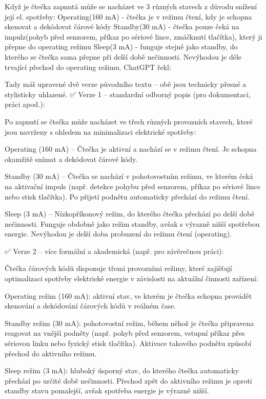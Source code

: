 Když je čtečka zapnutá může se nacházet ve 3 různých stavech z důvodu snížení její el. spotřeby:
Operating(160 mA) - čtečka je v režimu čtení, kdy je schopna skenovat a dekódovat čárové kódy
Standby(30 mA) - čtečka pouze čeká na impulz(pohyb před senzorem, příkaz po sériové lince, zmáčknutí tlačítka), který ji přepne do operating režimu
Sleep(3 mA) - funguje stejně jako standby, do kterého se čtečka sama přepne při delší době nečinnosti. Nevýhodou je déle trvající přechod do operating režimu.
ChatGPT řekl:

Tady máš upravené dvě verze původního textu – obě jsou technicky přesné a stylisticky uhlazené.
✅ Verze 1 – standardní odborný popis (pro dokumentaci, práci apod.):

    Po zapnutí se čtečka může nacházet ve třech různých provozních stavech, které jsou navrženy s ohledem na minimalizaci elektrické spotřeby:

        Operating (160 mA) – Čtečka je aktivní a nachází se v režimu čtení. Je schopna okamžitě snímat a dekódovat čárové kódy.

        Standby (30 mA) – Čtečka se nachází v pohotovostním režimu, ve kterém čeká na aktivační impuls (např. detekce pohybu před senzorem, příkaz po sériové lince nebo stisk tlačítka). Po přijetí podnětu automaticky přechází do režimu čtení.

        Sleep (3 mA) – Nízkopříkonový režim, do kterého čtečka přechází po delší době nečinnosti. Funguje obdobně jako režim standby, avšak s výrazně nižší spotřebou energie. Nevýhodou je delší doba probuzení do režimu čtení (operating).

✅ Verze 2 – více formální a akademická (např. pro závěrečnou práci):

    Čtečka čárových kódů disponuje třemi provozními režimy, které zajišťují optimalizaci spotřeby elektrické energie v závislosti na aktuální činnosti zařízení:

        Operating režim (160 mA): aktivní stav, ve kterém je čtečka schopna provádět skenování a dekódování čárových kódů v reálném čase.

        Standby režim (30 mA): pohotovostní režim, během něhož je čtečka připravena reagovat na vnější podněty (např. pohyb před senzorem, vstupní příkaz přes sériovou linku nebo fyzický stisk tlačítka). Aktivace takového podnětu způsobí přechod do aktivního režimu.

        Sleep režim (3 mA): hluboký úsporný stav, do kterého čtečka automaticky přechází po určité době nečinnosti. Přechod zpět do aktivního režimu je oproti standby stavu pomalejší, avšak spotřeba energie je výrazně nižší.

